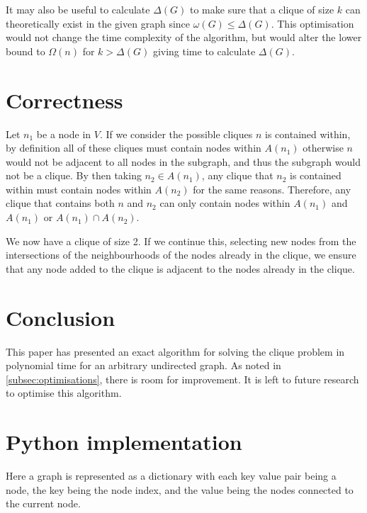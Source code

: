 \documentclass[11pt]{article}
\begin{document}
It may also be useful to calculate $\Delta(G)$ to make sure that a clique of size $k$ can theoretically exist in the given graph since $\omega(G)\leq\Delta(G)$. This optimisation would not change the time complexity of the algorithm, but would alter the lower bound to $\Omega(n)$ for $k>\Delta(G)$ giving time to calculate $\Delta(G)$.

\section{Correctness}

Let $n_1$ be a node in $V$. If we consider the possible cliques $n$ is contained within, by definition all of these cliques must contain nodes within $A(n_1)$ otherwise $n$ would not be adjacent to all nodes in the subgraph, and thus the subgraph would not be a clique. By then taking $n_2\in A(n_1)$, any clique that $n_2$ is contained within must contain nodes within $A(n_2)$ for the same reasons. Therefore, any clique that contains both $n$ and $n_2$ can only contain nodes within $A(n_1)$ and $A(n_1)$ or $A(n_1)\cap A(n_2)$.

We now have a clique of size 2. If we continue this, selecting new nodes from the intersections of the neighbourhoods of the nodes already in the clique, we ensure that any node added to the clique is adjacent to the nodes already in the clique.

\section{Conclusion}

This paper has presented an exact algorithm for solving the clique problem in polynomial time for an arbitrary undirected graph. As noted in \cref{subsec:optimisations}, there is room for improvement. It is left to future research to optimise this algorithm.

\appendix
\section{Python implementation}
\label{apdx:a}
Here a graph is represented as a dictionary with each key value pair being a node, the key being the node index, and the value being the nodes connected to the current node.




\end{document}
